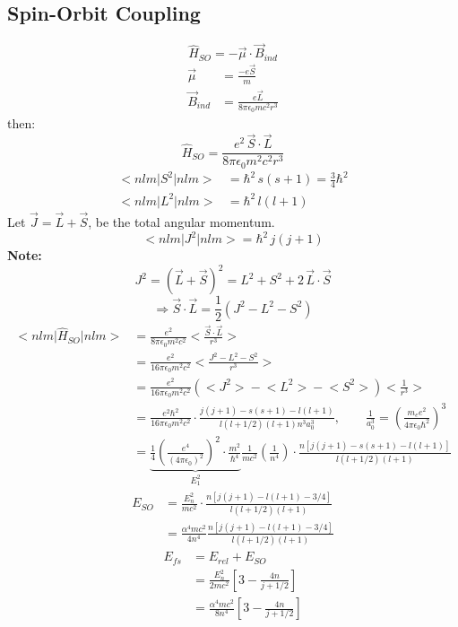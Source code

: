 \documentclass[12pt,fancychapters]{report}
\numberwithin{equation}{section}
\begin{document}
\subsection{Spin-Orbit Coupling}
\[
  \boxed{\hat{H}_{SO} = -\vec{\mu}\cdot \vec{B}_{ind}}
\]
\begin{align*}
  \vec{\mu} &= \frac{-e\vec{S}}{m}\\
  \vec{B}_{ind} &= \frac{e\vec{L}}{8\pi\epsilon_0 mc^2 r^3}
\end{align*}
then:
\[
  \hat{H}_{SO} = \frac{e^2\,\vec{S}\cdot\vec{L}}{8\pi\epsilon_0 m^2c^2r^3}
\]
\begin{align*}
  \big<nlm\big|S^2\big|nlm\big> &= \hbar^2\,s(s+1) = \frac{3}{4}\hbar^2\\
 \big<nlm\big|L^2\big|nlm\big> &= \hbar^2\,l(l+1)
\end{align*}
Let $\vec{J} = \vec{L}+\vec{S}$, be the total angular momentum.
\[
   \big<nlm\big|J^2\big|nlm\big> = \hbar^2\,j(j+1)
\]
\textbf{Note:}
\[
  J^2 = \left(\vec{L}+\vec{S}\right)^2 = L^2 + S^2 + 2\,\vec{L}\cdot\vec{S}
\]
\[
  \Rightarrow \vec{S}\cdot\vec{L} = \frac{1}{2}\left(J^2 -L^2 -S^2 \right)
\]
\begin{align*}
  \big<nlm\big|\hat{H}_{SO}\big|nlm\big> &= \frac{e^2}{8\pi\epsilon_0m^2c^2}
  \bigg<\frac{\vec{S}\cdot\vec{L}}{r^3}\bigg>\\
&=\frac{e^2}{16\pi\epsilon_0m^2c^2}\bigg< \frac{J^2-L^2-S^2}{r^3}\bigg>\\
&=\frac{e^2}{16\pi\epsilon_0m^2c^2}\left(\big<J^2\big> - \big<L^2\big>-\big<S^2\big>\right)
\bigg< \frac{1}{r^3}\bigg>\\
&=\frac{e^2\hbar^2}{16\pi\epsilon_0m^2c^2}\cdot\frac{j(j+1)-s(s+1)-l(l+1)}{l(l+1/2)(l+1)n^3a_0^3},
\qquad \frac{1}{a_0^3}= \left(\frac{m_ee^2}{4\pi\epsilon_0\hbar^2}\right)^3\\
&= \underbrace{\frac{1}{4}\left(\frac{e^4}{(4\pi\epsilon_0)^2}\right)^2\cdot\frac{m^2}{\hbar^4}}
_{E_1^2}\frac{1}{mc^2}\left(\frac{1}{n^4}\right)\cdot
\frac{n[j(j+1)-s(s+1)-l(l+1)]}{l(l+1/2)(l+1)}
\end{align*}
\begin{align*}
  E_{SO} &= \frac{E_n^2}{mc^2}\cdot\frac{n[j(j+1)-l(l+1)-3/4]}{l(l+1/2)(l+1)}\\
         &= \frac{\alpha^4 m c^2}{4n^4}\frac{n[j(j+1)-l(l+1)-3/4]}{l(l+1/2)(l+1)}
\end{align*}
\begin{align*}
  E_{fs} &= E_{rel} + E_{SO}\\
         &= \frac{E_n^2}{2mc^2}\left[3-\frac{4n}{j+1/2} \right]\\
         &= \frac{\alpha^4 mc^2}{8n^4}\left[3-\frac{4n}{j+1/2} \right]
\end{align*}
\end{document}
